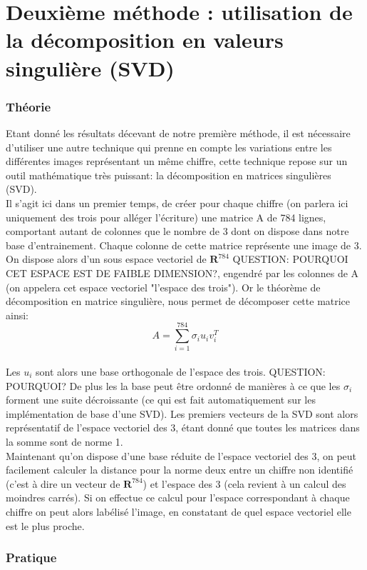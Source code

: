 \documentclass[a4paper,11pt,twoside]{report}
\begin{document}
\chapter{Deuxième méthode : utilisation de la décomposition en valeurs singulière (SVD)}
\subsection{Théorie}
Etant donné les résultats décevant de notre première méthode, il est nécessaire d'utiliser une autre technique qui prenne en compte les variations entre les différentes images représentant un même chiffre, cette technique repose sur un outil mathématique très puissant: la décomposition en matrices singulières (SVD).\\
Il s'agit ici dans un premier temps, de créer pour chaque chiffre (on parlera ici uniquement des trois pour alléger l'écriture) une matrice A de 784 lignes, comportant autant de colonnes que le nombre de 3 dont on dispose dans notre base d'entrainement. Chaque colonne de cette matrice représente une image de 3. On dispose alors d'un sous espace vectoriel de $\textbf{R}^{784}$ QUESTION: POURQUOI CET ESPACE EST DE FAIBLE DIMENSION?, engendré par les colonnes de A (on appelera cet espace vectoriel "l'espace des trois"). Or le théorème de décomposition en matrice singulière, nous permet de décomposer cette matrice ainsi: $$A = \sum_{i=1}^{784}{\sigma_{i}u_{i}v_{i}^{T}}$$\\
Les $u_{i}$ sont alors une base orthogonale de l'espace des trois. QUESTION: POURQUOI? De plus les la base peut être ordonné de manières à ce que les $\sigma_{i}$ forment une suite décroissante (ce qui est fait automatiquement sur les implémentation de base d'une SVD). Les premiers vecteurs de la SVD sont alors représentatif de l'espace vectoriel des 3, étant donné que toutes les matrices dans la somme sont de norme 1.\\
Maintenant qu'on dispose d'une base réduite de l'espace vectoriel des 3, on peut facilement calculer la distance pour la norme deux entre un chiffre non identifié (c'est à dire un vecteur de  $\textbf{R}^{784}$) et l'espace des 3 (cela revient à un calcul des moindres carrés). Si on effectue ce calcul pour l'espace correspondant à chaque chiffre on peut alors labélisé l'image, en constatant de quel espace vectoriel elle est le plus proche.

\subsection{Pratique}
\end{document}
